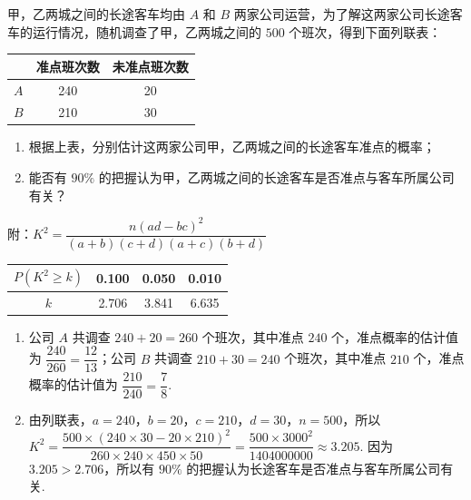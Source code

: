 \begin{problem}
甲，乙两城之间的长途客车均由 \(A\) 和 \(B\) 两家公司运营，为了解这两家公司长途客车的运行情况，随机调查了甲，乙两城之间的 \(500\) 个班次，得到下面列联表：

\begin{center}
\begin{tabular}{c c c}
\hline
& 准点班次数 & 未准点班次数 \\
\hline
\(A\) & 240 & 20 \\
\(B\) & 210 & 30 \\
\hline
\end{tabular}
\end{center}

\begin{enumerate}
\item 根据上表，分别估计这两家公司甲，乙两城之间的长途客车准点的概率；
\item 能否有 \(90\%\) 的把握认为甲，乙两城之间的长途客车是否准点与客车所属公司有关？
\end{enumerate}

附：\(K^2=\dfrac{n\left(ad-bc\right)^2}{\left(a+b\right)\left(c+d\right)\left(a+c\right)\left(b+d\right)}\)

\begin{center}
\begin{tabular}{c c c c}
\hline
\(P\left(K^2\ge k\right)\) & 0.100 & 0.050 & 0.010 \\
\hline
\(k\) & 2.706 & 3.841 & 6.635 \\
\hline
\end{tabular}
\end{center}
\end{problem}

\begin{solution}
\begin{enumerate}
\item 公司 \(A\) 共调查 \(240+20=260\) 个班次，其中准点 \(240\) 个，准点概率的估计值为 \(\dfrac{240}{260}=\dfrac{12}{13}\)；公司 \(B\) 共调查 \(210+30=240\) 个班次，其中准点 \(210\) 个，准点概率的估计值为 \(\dfrac{210}{240}=\dfrac78\).

\item 由列联表，\(a=240\)，\(b=20\)，\(c=210\)，\(d=30\)，\(n=500\)，所以
\(K^2=\dfrac{500\times(240\times30-20\times210)^2}{260\times240\times450\times50}=\dfrac{500\times3000^2}{1404000000}\approx3.205\). 因为 \(3.205>2.706\)，所以有 \(90\%\) 的把握认为长途客车是否准点与客车所属公司有关.
\end{enumerate}
\end{solution}

